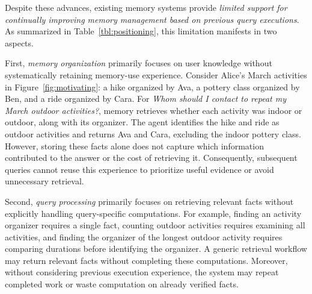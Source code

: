 

Despite these advances, existing memory systems provide \emph{limited support for continually improving memory management based on previous query executions}.
As summarized in Table~\ref{tbl:positioning}, this limitation manifests in two aspects.

First, \emph{memory organization} primarily focuses on user knowledge without systematically retaining memory-use experience.
Consider Alice's March activities in Figure~\ref{fig:motivating}: a hike organized by Ava, a pottery class organized by Ben, and a ride organized by Cara.
For \emph{Whom should I contact to repeat my March outdoor activities?}, memory retrieves whether each activity was indoor or outdoor,
along with its organizer. The agent identifies the hike and ride as outdoor activities and returns Ava and Cara, excluding the indoor pottery class. However, storing these facts alone does not capture which information contributed to the answer or the cost of retrieving it.
Consequently, subsequent queries cannot reuse this experience to prioritize useful evidence or avoid unnecessary retrieval.

Second, \emph{query processing} primarily focuses on retrieving relevant facts without explicitly handling query-specific computations. For example, finding an activity organizer requires a single fact, counting outdoor activities requires examining all activities, and finding the organizer of the longest outdoor activity requires comparing durations before identifying the organizer. A generic retrieval workflow may return relevant facts without completing these computations. Moreover, without considering previous execution experience, the system may repeat completed work or waste computation on already verified facts.


